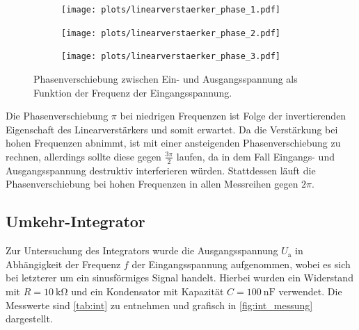 \begin{figure}[H]
  \centering
  \begin{subfigure}{.4\textwidth}
    \texttt{[image: plots/linearverstaerker\_phase\_1.pdf]}
  \end{subfigure}
  \begin{subfigure}{.4\textwidth}
    \texttt{[image: plots/linearverstaerker\_phase\_2.pdf]}
  \end{subfigure}
  \begin{subfigure}{.4\textwidth}
    \texttt{[image: plots/linearverstaerker\_phase\_3.pdf]}
  \end{subfigure}
  \caption{Phasenverschiebung zwischen Ein- und Ausgangsspannung als Funktion der Frequenz der Eingangsspannung.}
  \label{fig:phase}
\end{figure}
Die Phasenverschiebung $\pi$ bei niedrigen Frequenzen ist Folge der invertierenden Eigenschaft des Linearverstärkers und somit erwartet. Da die Verstärkung bei hohen Frequenzen abnimmt, ist mit einer ansteigenden Phasenverschiebung zu rechnen, allerdings sollte diese gegen $\frac{3\pi}{2}$ laufen, da in dem Fall Eingangs- und Ausgangsspannung destruktiv interferieren würden. Stattdessen läuft die Phasenverschiebung bei hohen Frequenzen in allen Messreihen gegen $2\pi$.

\subsection{Umkehr-Integrator}
Zur Untersuchung des Integrators wurde die Ausgangsspannung $U_\mathrm{a}$ in Abhängigkeit der Frequenz $f$ der Eingangsspannung aufgenommen, wobei es sich bei letzterer um ein sinusförmiges Signal handelt. Hierbei wurden ein Widerstand mit $R = \SI{10}{\kilo\ohm}$ und ein Kondensator mit Kapazität $C = \SI{100}{\nano\farad}$ verwendet. Die Messwerte sind \autoref{tab:int} zu entnehmen und grafisch in \autoref{fig:int_messung} dargestellt.

